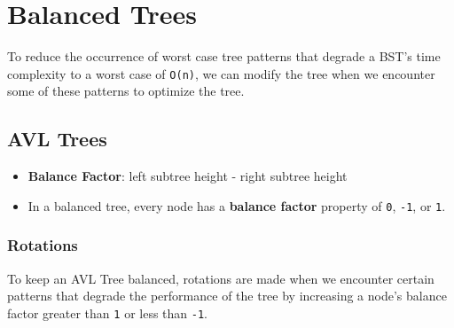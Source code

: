 \documentclass[12pt, letterpaper]{article}
\begin{document}
\section*{Balanced Trees}

To reduce the occurrence of worst case tree patterns that degrade a BST's time complexity to a worst case of \texttt{O(n)}, we can modify the tree when we encounter some of these patterns to optimize the tree.

\subsection*{AVL Trees}

\begin{itemize}
    \item \textbf{Balance Factor}: left subtree height - right subtree height
    \item In a balanced tree, every node has a \textbf{balance factor} property of \texttt{0}, \texttt{-1}, or \texttt{1}.
\end{itemize}

\subsubsection*{Rotations}

To keep an AVL Tree balanced, rotations are made when we encounter certain patterns that degrade the performance of the tree by increasing a node's balance factor greater than \texttt{1} or less than \texttt{-1}.
\end{document}
